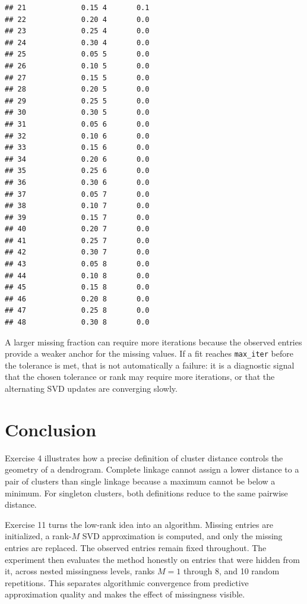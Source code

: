 \documentclass[
  11pt,
]{article}
\begin{document}
\begin{verbatim}
## 21             0.15 4       0.1
## 22             0.20 4       0.0
## 23             0.25 4       0.0
## 24             0.30 4       0.0
## 25             0.05 5       0.0
## 26             0.10 5       0.0
## 27             0.15 5       0.0
## 28             0.20 5       0.0
## 29             0.25 5       0.0
## 30             0.30 5       0.0
## 31             0.05 6       0.0
## 32             0.10 6       0.0
## 33             0.15 6       0.0
## 34             0.20 6       0.0
## 35             0.25 6       0.0
## 36             0.30 6       0.0
## 37             0.05 7       0.0
## 38             0.10 7       0.0
## 39             0.15 7       0.0
## 40             0.20 7       0.0
## 41             0.25 7       0.0
## 42             0.30 7       0.0
## 43             0.05 8       0.0
## 44             0.10 8       0.0
## 45             0.15 8       0.0
## 46             0.20 8       0.0
## 47             0.25 8       0.0
## 48             0.30 8       0.0
\end{verbatim}

A larger missing fraction can require more iterations because the
observed entries provide a weaker anchor for the missing values. If a
fit reaches \texttt{max\_iter} before the tolerance is met, that is not
automatically a failure: it is a diagnostic signal that the chosen
tolerance or rank may require more iterations, or that the alternating
SVD updates are converging slowly.

\section{Conclusion}\label{conclusion}

Exercise 4 illustrates how a precise definition of cluster distance
controls the geometry of a dendrogram. Complete linkage cannot assign a
lower distance to a pair of clusters than single linkage because a
maximum cannot be below a minimum. For singleton clusters, both
definitions reduce to the same pairwise distance.

Exercise 11 turns the low-rank idea into an algorithm. Missing entries
are initialized, a rank-\(M\) SVD approximation is computed, and only
the missing entries are replaced. The observed entries remain fixed
throughout. The experiment then evaluates the method honestly on entries
that were hidden from it, across nested missingness levels, ranks
\(M=1\) through \(8\), and 10 random repetitions. This separates
algorithmic convergence from predictive approximation quality and makes
the effect of missingness visible.
\end{document}
